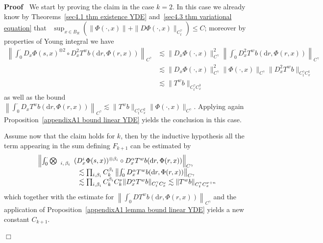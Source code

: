 \documentclass[10pt]{article}
\newcommand{\mathd}{\mathrm{d}}
\newcommand{\nobracket}{}
\newcommand{\tmscript}[1]{\text{\scriptsize{$#1$}}}
\newenvironment{proof}{\noindent\textbf{Proof\ }}{\hspace*{\fill}$\Box$\medskip}
\begin{document}
\begin{proof}
  We start by proving the claim in the case $k = 2$. In this case we already
  know by Theorems~\ref{sec4.1 thm existence YDE} and~\ref{sec4.3 thm
  variational equation} that \ $\sup_{x \in B_R}  (\| \Phi (\cdot, x) \| + \|
  D \Phi (\cdot, x) \|_{C^{\gamma}_t}) \leqslant C$; moreover by properties of
  Young integral we have
%  
  \begin{align*}
    \left\| \int_0^{\cdot} D_x \Phi (s, x)^{\otimes 2} \circ \nobracket D_x^2
    T^w b (\mathd r, \Phi (r, x) \nobracket) \right\|_{C^{\gamma}} & \lesssim
    \| D_x \Phi (\cdot, x) \|_{C^{\gamma}}^2  \left\| \int_0^{\cdot} D_x^2 T^w
    b (\mathd r, \Phi (r, x)) \right\|_{C^{\gamma}}\\
    & \lesssim \| D_x \Phi (\cdot, x) \|_{C^{\gamma}}^2  \| \Phi (\cdot, x)
    \|_{C^{\gamma}}  \| D_x^2 T^w b \|_{C^{\gamma}_t C^1_x}\\
    & \lesssim \| T^w b \|_{C^{\gamma}_t C^3_x}
  \end{align*}
%  
  as well as the bound $\left\| \int_0^{\cdot} D_x T^w b (\mathd r, \Phi (r,
  x)) \right\|_{C^{\gamma}} \lesssim \| T^w b \|_{C^{\gamma}_t C^2_x}  \| \Phi
  (\cdot, x) \|_{C^{\gamma}}$. Applying again Proposition~\ref{appendixA1
  bound linear YDE} yields the conclusion in this case.
  
  Assume now that the claim holds for $k$, then by the inductive hypothesis
  all the term appearing in the sum defining $F_{k + 1}$ can be estimated by
  \[ \begin{array}{l}
       \left\| \int_0^{\cdot} \bigotimes_{\tmscript{\begin{array}{c}
         i, \beta_i
       \end{array}}} (D_x^i \Phi (s, x))^{\otimes \beta_i} \circ \nobracket
       D_x^{\alpha} T^w b (\mathd r, \Phi (r, x) \nobracket)
       \right\|_{C^{\gamma}}\\
       \qquad \qquad \qquad \lesssim \prod_{i, \beta_i} C_k^{\beta_i}  \left\|
       \int_0^{\cdot} D_x^{\alpha} T^w b (\mathd r, \Phi (r, x))
       \right\|_{C^{\gamma}}\\
       \qquad \qquad \qquad \lesssim \prod_{i, \beta_i} C_k^{\beta_i}
       C_k^{\nu}  \| D_x^{\alpha} T^w b \|_{C^{\gamma}_t C^{\nu}_x} \lesssim
       \| T^w b \|_{C^{\gamma}_t C^{\nu + n}_x}
     \end{array} \]
  which together with the estimate for $\left\| \int_0^{\cdot} D T^w b (\mathd
  r, \Phi (r, x)) \right\|_{C^{\gamma}}$ and the application of
  Proposition~\ref{appendixA1 lemma bound linear YDE} yields a new constant
  $C_{k + 1}$.
  

\end{proof}
\end{document}
